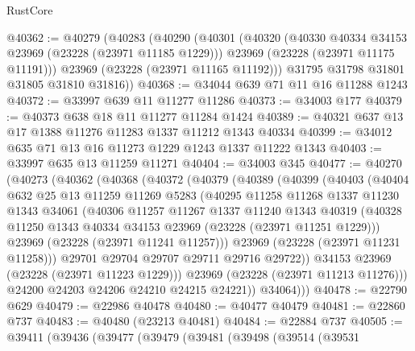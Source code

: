 \begin{lexlean}{RustCore}
\begin{coremodule}
@40362 := @40279
    (@40283
      (@40290
        (@40301
          (@40320
            (@40330 @40334 @34153 @23969 (@23228 (@23971 @11185 @1229)))
            @23969
            (@23228 (@23971 @11175 @11191)))
          @23969
          (@23228 (@23971 @11165 @11192)))
        @31795
        @31798
        @31801
        @31805
        @31810
        @31816))
@40368 := @34044 @639 @71 @11 @16 @11288 @1243
@40372 := @33997 @639 @11 @11277 @11286
@40373 := @34003 @177
@40379 := @40373 @638 @18 @11 @11277 @11284 @1424
@40389 := @40321 @637 @13 @17 @1388 @11276 @11283 @1337 @11212 @1343 @40334
@40399 := @34012 @635 @71 @13 @16 @11273 @1229 @1243 @1337 @11222 @1343
@40403 := @33997 @635 @13 @11259 @11271
@40404 := @34003 @345
@40477 := @40270
    (@40273
      (@40362
        (@40368
          (@40372
            (@40379
              (@40389
                (@40399
                  (@40403
                    (@40404
                      @632
                      @25
                      @13
                      @11259
                      @11269
                      @5283
                      (@40295
                        @11258
                        @11268
                        @1337
                        @11230
                        @1343
                        @34061
                        (@40306
                          @11257
                          @11267
                          @1337
                          @11240
                          @1343
                          @40319
                          (@40328 @11250 @1343 @40334 @34153 @23969 (@23228 (@23971 @11251 @1229)))
                          @23969
                          (@23228 (@23971 @11241 @11257)))
                        @23969
                        (@23228 (@23971 @11231 @11258)))
                      @29701
                      @29704
                      @29707
                      @29711
                      @29716
                      @29722))
                  @34153
                  @23969
                  (@23228 (@23971 @11223 @1229)))
                @23969
                (@23228 (@23971 @11213 @11276)))
              @24200
              @24203
              @24206
              @24210
              @24215
              @24221))
          @34064)))
@40478 := @22790 @629
@40479 := @22986 @40478
@40480 := @40477 @40479
@40481 := @22860 @737
@40483 := @40480 (@23213 @40481)
@40484 := @22884 @737
@40505 := @39411
    (@39436
      (@39477
        (@39479
          (@39481
            (@39498
              (@39514
                (@39531

\end{coremodule}
\end{lexlean}
